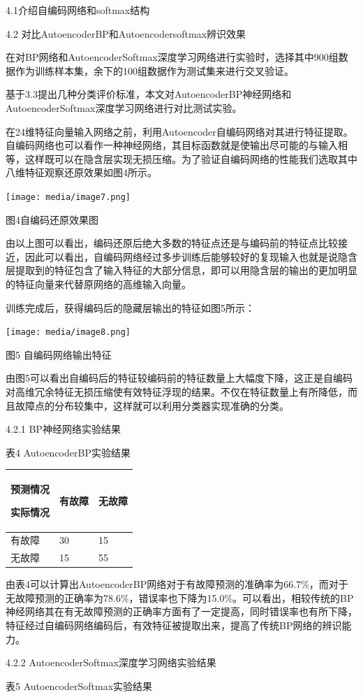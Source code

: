 \documentclass{ctacn}%
\begin{document}
\begin{multicols}{2}
4.1介绍自编码网络和softmax结构

4.2 对比AutoencoderBP和Autoencodersoftmax辨识效果

在对BP网络和AutoencoderSoftmax深度学习网络进行实验时，选择其中900组数据作为训练样本集，余下的100组数据作为测试集来进行交叉验证。

基于3.3提出几种分类评价标准，本文对AutoencoderBP神经网络和AutoencoderSoftmax深度学习网络进行对比测试实验。

在24维特征向量输入网络之前，利用Autoencoder自编码网络对其进行特征提取。自编码网络也可以看作一种神经网络，其目标函数就是使输出尽可能的与输入相等，这样既可以在隐含层实现无损压缩。为了验证自编码网络的性能我们选取其中八维特征观察还原效果如图4所示。

\texttt{[image: media/image7.png]}

图4自编码还原效果图

由以上图可以看出，编码还原后绝大多数的特征点还是与编码前的特征点比较接近，因此可以看出，自编码网络经过多步训练后能够较好的复现输入也就是说隐含层提取到的特征包含了输入特征的大部分信息，即可以用隐含层的输出的更加明显的特征向量来代替原网络的高维输入向量。

训练完成后，获得编码后的隐藏层输出的特征如图5所示：

\texttt{[image: media/image8.png]}

图5 自编码网络输出特征

由图5可以看出自编码后的特征较编码前的特征数量上大幅度下降，这正是自编码对高维冗余特征无损压缩使有效特征浮现的结果。不仅在特征数量上有所降低，而且故障点的分布较集中，这样就可以利用分类器实现准确的分类。

4.2.1 BP神经网络实验结果

表4 AutoencoderBP实验结果

\begin{longtable}[c]{@{}lll@{}}
\toprule
预测情况

实际情况 & 有故障 & 无故障\tabularnewline
\midrule
\endhead
有故障 & 30 & 15\tabularnewline
无故障 & 15 & 55\tabularnewline
\bottomrule
\end{longtable}

由表4可以计算出AutoencoderBP网络对于有故障预测的准确率为66.7\%，而对于无故障预测的正确率为78.6\%，错误率也下降为15.0\%。可以看出，相较传统的BP神经网络其在有无故障预测的正确率方面有了一定提高，同时错误率也有所下降，特征经过自编码网络编码后，有效特征被提取出来，提高了传统BP网络的辨识能力。

4.2.2 AutoencoderSoftmax深度学习网络实验结果

表5 AutoencoderSoftmax实验结果


\end{multicols}
\end{document}
